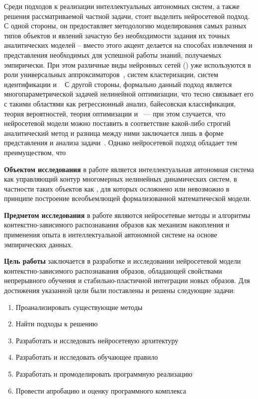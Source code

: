 Среди подходов к реализации интеллектуальных автономных систем, а также решения рассматриваемой частной задачи, стоит выделить нейросетевой подход. С одной стороны, он предоставляет методологию моделирования самых разных типов объектов и явлений зачастую без необходимости задания их точных аналитических моделей -- вместо этого акцент делается на способах извлечения и представления необходимых для успешной работы знаний, получаемых эмпирически. При этом различные виды нейронных сетей () уже используются в роли универсальных аппроксиматоров~\cite{Cybenko1989}, систем кластеризации, систем идентификации и \etc~\cite{Haykin2008} С другой стороны, формально данный подход является многопараметрической задачей нелинейной оптимизации, что тесно связывает его с такими областями как регрессионный анализ, байесовская классификация, теория вероятностей, теория оптимизации и \other~--- при этом случается, что нейросетевой модели можно поставить в соответствие какой-либо строгий аналитический метод и разница между ними заключается лишь в форме представления и анализа задачи~\cite{Vorontsov2015-SHAD}. Однако нейросетевой подход обладает тем преимуществом, что


\textbf{Объектом исследования} в работе является интеллектуальная автономная система как управляющий контур многомерных нелинейных динамических систем, в частности таких объектов как , для которых осложнено или невозможно в принципе построение всеобъемлющей формализованной математической модели.

\textbf{Предметом исследования} в работе являются нейросетевые методы и алгоритмы контекстно-зависимого распознавания образов как механизм накопления и применения опыта в интеллектуальной автономной системе на основе эмпирических данных.

\textbf{Цель работы} заключается в разработке и исследовании нейросетевой модели контекстно-зависимого распознавания образов, обладающей свойствами непрерывного обучения и стабильно-пластичной интеграции  новых образов. Для достижения указанной цели были поставлены и решены следующие задачи:
\begin{enumerate}[label=\arabic*)]
    \item Проанализировать существующие методы
    \item Найти подходы к решению
    \item Разработать и исследовать нейросетевую архитектуру
    \item Разработать и исследовать обучающее правило
    \item Разработать и промоделировать программную реализацию
    \item Провести апробацию и оценку программного комплекса
\end{enumerate}

